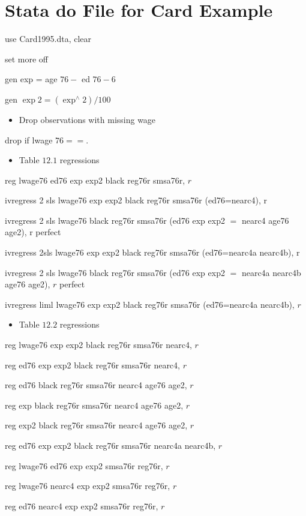 \documentclass[10pt]{article}
\begin{document}
\section{Stata do File for Card Example}
use Card1995.dta, clear

set more off

gen exp = age $76-$ ed $76-6$

gen $\exp 2=\left(\exp ^{\wedge} 2\right) / 100$

\begin{itemize}
  \item Drop observations with missing wage
\end{itemize}
drop if lwage $76==.$

\begin{itemize}
  \item Table $12.1$ regressions
\end{itemize}
reg lwage76 ed76 exp exp2 black reg76r smsa76r, $r$

ivregress 2 sls lwage76 exp exp2 black reg76r smsa76r (ed76=nearc4), r

ivregress 2 sls lwage76 black reg76r smsa76r (ed76 exp exp2 $=$ nearc4 age76 age2), r perfect

ivregress 2sls lwage76 exp exp2 black reg76r smsa76r (ed76=nearc4a nearc4b), $\mathrm{r}$

ivregress 2 sls lwage76 black reg76r smsa76r (ed76 exp exp2 $=$ nearc4a nearc4b age76 age2), $r$ perfect

ivregress liml lwage76 exp exp2 black reg76r smsa76r (ed76=nearc4a nearc4b), $r$

\begin{itemize}
  \item Table $12.2$ regressions
\end{itemize}
reg lwage76 exp exp2 black reg76r smsa76r nearc4, $r$

reg ed76 exp exp2 black reg76r smsa76r nearc4, $r$

reg ed76 black reg76r smsa76r nearc4 age76 age2, $r$

reg exp black reg76r smsa76r nearc4 age76 age2, $r$

reg exp2 black reg76r smsa76r nearc4 age76 age2, $r$

reg ed76 exp exp2 black reg76r smsa76r nearc4a nearc4b, $r$

reg lwage76 ed76 exp exp2 smsa76r reg76r, $r$

reg lwage76 nearc4 exp exp2 smsa76r reg76r, $r$

reg ed76 nearc4 exp exp2 smsa76r reg76r, $r$
\end{document}
